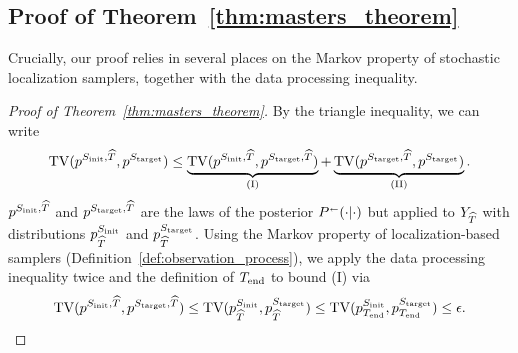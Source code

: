 \subsection{Proof of Theorem~\ref{thm:masters_theorem}}

\noindent Crucially, our proof relies in several places on the Markov property of stochastic localization samplers, together with the data processing inequality. 

\begin{proof}[Proof of Theorem~\ref{thm:masters_theorem}]
By the triangle inequality, we can write
\begin{align*}
\mathrm{TV}(p^{S_{\mathrm{init}},\widehat{T}},p^{S_{\mathrm{target}}})\leq \underbrace{\mathrm{TV}(p^{S_{\mathrm{init}},\widehat{T}},p^{S_{\mathrm{target}},\widehat{T}})}_{\text{(I)}}+\underbrace{\mathrm{TV}(p^{S_{\mathrm{target}},\widehat{T}},p^{S_{\mathrm{target}}})}_{\text{(II)}}.
\end{align*}
$p^{S_{\mathrm{init}},\widehat{T}}$ and $p^{S_{\mathrm{target}},\widehat{T}}$ are the laws of the posterior $\kernelreverse[](\cdot | \cdot)$ but applied to $Y_{\widehat{T}}$ with distributions $p^{S_{\mathrm{init}}}_{\widehat{T}}$ and $p^{S_{\mathrm{target}}}_{\widehat{T}}$. Using the Markov property of localization-based samplers (Definition~\ref{def:observation_process}), we apply the data processing inequality twice and the definition of $T_{\mathrm{end}}$ to bound (I) via \[\mathrm{TV}(p^{S_{\mathrm{init}},\widehat{T}},p^{S_{\mathrm{target}},\widehat{T}})\leq \mathrm{TV}(p^{S_{\mathrm{init}}  }_{\widehat{T}},p^{S_{\mathrm{target}}}_{\widehat{T}}) 
 \leq\mathrm{TV}(p^{S_{\mathrm{init}}  }_{T_{\mathrm{end}}},p^{S_{\mathrm{target}}}_{T_{\mathrm{end}}}) \leq \epsilon.
\]


\end{proof}
